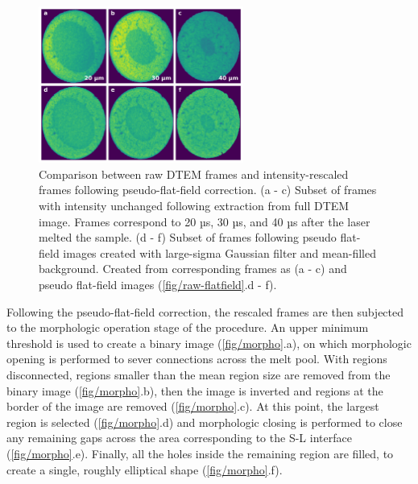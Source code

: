\begin{figure}[h]
    \centering
    \includegraphics[width=0.6\textwidth]{figures/04/06-raw-rescaled.png}
    \caption{
        \small{}
        Comparison between raw DTEM frames and intensity-rescaled frames
        following pseudo-flat-field correction.
        (a - c) Subset of frames with intensity unchanged following
        extraction from full DTEM image. Frames correspond to 20 µs, 30 µs,
        and 40 µs after the laser melted the sample.
        (d - f) Subset of frames following pseudo flat-field images created
        with large-sigma Gaussian filter and mean-filled background.
        Created from corresponding frames as (a - c) and pseudo flat-field
        images (\ref{fig/raw-flatfield}.d - f).
    }
    \label{fig/raw-rescaled}
\end{figure}

Following the pseudo-flat-field correction, the rescaled frames are then
subjected to the morphologic operation stage of the procedure. An upper
minimum threshold is used to create a binary image (\ref{fig/morpho}.a),
on which morphologic opening is performed to sever connections across the melt
pool. With regions disconnected, regions smaller than the mean region size
are removed from the binary image (\ref{fig/morpho}.b), then the image
is inverted and regions at the border of the image are removed
(\ref{fig/morpho}.c). At this point, the largest region is selected
(\ref{fig/morpho}.d) and morphologic closing is performed to close any
remaining gaps across the area corresponding to the S-L interface
(\ref{fig/morpho}.e). Finally, all the holes inside the
remaining region are filled, to create a single, roughly elliptical shape
(\ref{fig/morpho}.f).

